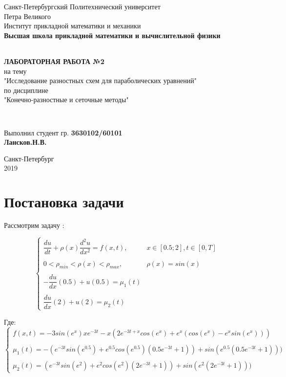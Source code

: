 \documentclass[12pt]{article}
\renewcommand{\listoffigures}{\begingroup  %
\tocsection
\tocfile{\listfigurename}{lof}
\endgroup}
\renewcommand{\listoftables}{\begingroup  %
\tocsection
\tocfile{\listtablename}{lot}
\endgroup}
\begin{document}
\begin{titlepage}
	\center
		Санкт-Петербургский Политехнический 
		университет \\ Петра Великого\\
		Институт прикладной математики и механики
		\\ \textbf{Высшая школа прикладной математики и вычислительной физики}

	\vfill ~
	\textbf{
		\\ \large ЛАБОРАТОРНАЯ РАБОТА №2
	}
	\\	на тему 
	\\ "Исследование разностных схем для параболических уравнений"
	\\ по дисциплине
	\\ "Конечно-разностные и сеточные методы"

	\vfill ~

	Выполнил студент гр. \textbf{3630102/60101} \\
	\textbf{Лансков.Н.В.} \\ 

\vfill

{\large}	Санкт-Петербург
\\ 2019
\end{titlepage}


\tableofcontents 
\newpage
\listoffigures
\newpage
\listoftables
\newpage

\section{Постановка задачи}

Рассмотрим задачу :

$$
\begin{cases}
\dfrac{du}{dt} + \rho(x)\dfrac{d^2u}{dx^2} = f(x, t), & x \in [0.5;2],  t \in [0, T] \\ \\
0 < \rho_{min} < \rho(x) < \rho_{max}, & \rho(x) = sin(x) \\ \\
 - \dfrac{du}{dx}(0.5) + u(0.5) = \mu_1(t) \\ \\
\dfrac{du}{dx}(2) + u(2) = \mu_2(t)
\end{cases}
$$

Где:
$$
\begin{cases}
f(x, t) = -3sin(e^x)xe^{-3t} - x(2e^{-3t+x}cos(e^x)+e^x(cos(e^x) - e^xsin(e^x)))  \\  \\ 
\mu_1(t) = -(e^{-3t}sin(e^{0.5}) + e^{0.5}cos(e^{0.5})(0.5e^{-3t}+1))+sin(e^{0.5}(0.5e^{-3t}+1)))\\ \\
\mu_2(t) = (e^{-3t}sin(e^{2}) + e^{2}cos(e^{2})(2e^{-3t}+1))+sin(e^{2}(2e^{-3t}+1)))
\end{cases}
$$
\end{document}
